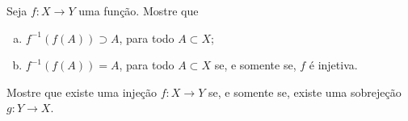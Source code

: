 \begin{challenge}
    Seja $f: X \to Y$ uma função. Mostre que
\begin{enumerate}[(a)]
  \item $f^{-1}(f(A)) \supset A$, para todo $A \subset X$;
  \item $f^{-1}(f(A)) = A$, para todo $A \subset X$ se, e
  somente se, $f$ é injetiva.
\end{enumerate}
\end{challenge}

\begin{challenge}
    Mostre que existe uma injeção $f: X \to Y$ se, e somente se,
existe uma sobrejeção $g: Y \to X$.
\end{challenge}


